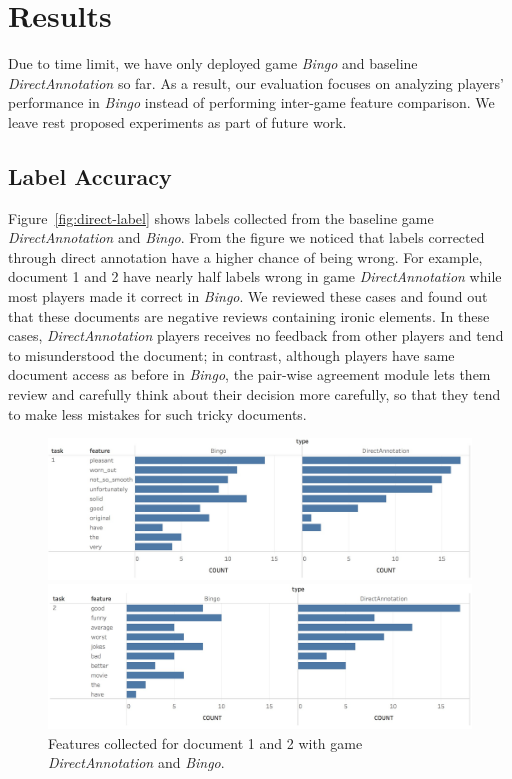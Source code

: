 \documentclass[chi_draft]{sigchi}
\begin{document}
\section{Results}

Due to time limit, we have only deployed game \emph{Bingo} and baseline \emph{DirectAnnotation} so far. As a result, our evaluation focuses on analyzing players' performance in \emph{Bingo} instead of performing inter-game feature comparison. We leave rest proposed experiments as part of future work.

\subsection{Label Accuracy}

Figure~\ref{fig:direct-label} shows labels collected from the baseline game \emph{DirectAnnotation} and \emph{Bingo}. From the figure we noticed that labels corrected through direct annotation have a higher chance of being wrong. For example, document 1 and 2 have nearly half labels wrong in game \emph{DirectAnnotation} while most players made it correct in \emph{Bingo}. We reviewed these cases and found out that these documents are negative reviews containing ironic elements. In these cases, \emph{DirectAnnotation} players receives no feedback from other players and tend to misunderstood the document; in contrast, although players have same document access as before in \emph{Bingo}, the pair-wise agreement module lets them review and carefully think about their decision more carefully, so that they tend to make less mistakes for such tricky documents.


\begin{figure}[t]
\includegraphics[width=\linewidth]{figures/feature-doc-1}

\includegraphics[width=\linewidth]{figures/feature-doc-2}
\caption{Features collected for document 1 and 2 with game \emph{DirectAnnotation} and \emph{Bingo}.}
\label{fig:feature}
\end{figure}
\end{document}
